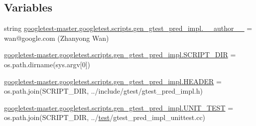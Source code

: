 \subsection*{Variables}
\begin{DoxyCompactItemize}
\item 
string \mbox{\hyperlink{namespacegoogletest-master_1_1googletest_1_1scripts_1_1gen__gtest__pred__impl_a961b1d3d2a4543ca0f758bb65b4a5572}{googletest-\/master.\+googletest.\+scripts.\+gen\+\_\+gtest\+\_\+pred\+\_\+impl.\+\_\+\+\_\+author\+\_\+\+\_\+}} = \textquotesingle{}wan@google.\+com (Zhanyong Wan)\textquotesingle{}
\item 
\mbox{\hyperlink{namespacegoogletest-master_1_1googletest_1_1scripts_1_1gen__gtest__pred__impl_a60ad41916eeebd40393b4def4f378b53}{googletest-\/master.\+googletest.\+scripts.\+gen\+\_\+gtest\+\_\+pred\+\_\+impl.\+S\+C\+R\+I\+P\+T\+\_\+\+D\+IR}} = os.\+path.\+dirname(sys.\+argv\mbox{[}0\mbox{]})
\item 
\mbox{\hyperlink{namespacegoogletest-master_1_1googletest_1_1scripts_1_1gen__gtest__pred__impl_aa571150af4d7157f72f367881fca920b}{googletest-\/master.\+googletest.\+scripts.\+gen\+\_\+gtest\+\_\+pred\+\_\+impl.\+H\+E\+A\+D\+ER}} = os.\+path.\+join(S\+C\+R\+I\+P\+T\+\_\+\+D\+IR, \textquotesingle{}../include/gtest/gtest\+\_\+pred\+\_\+impl.\+h\textquotesingle{})
\item 
\mbox{\hyperlink{namespacegoogletest-master_1_1googletest_1_1scripts_1_1gen__gtest__pred__impl_aa0cb0907a6ca38f18bb193457840140b}{googletest-\/master.\+googletest.\+scripts.\+gen\+\_\+gtest\+\_\+pred\+\_\+impl.\+U\+N\+I\+T\+\_\+\+T\+E\+ST}} = os.\+path.\+join(S\+C\+R\+I\+P\+T\+\_\+\+D\+IR, \textquotesingle{}../\mbox{\hyperlink{_mutual_8h_a707ee03719e99670bf6cfdfd897b8456}{test}}/gtest\+\_\+pred\+\_\+impl\+\_\+unittest.\+cc\textquotesingle{})
\end{DoxyCompactItemize}
